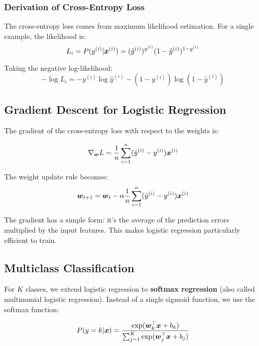 \subsubsection{Derivation of Cross-Entropy Loss}

The cross-entropy loss comes from maximum likelihood estimation. For a single example, the likelihood is:
$$L_i = P(y^{(i)}|\boldsymbol{x}^{(i)}) = (\hat{y}^{(i)})^{y^{(i)}} (1-\hat{y}^{(i)})^{1-y^{(i)}}$$

Taking the negative log-likelihood:
$$-\log L_i = -y^{(i)} \log \hat{y}^{(i)} - (1-y^{(i)}) \log(1-\hat{y}^{(i)})$$

\subsection{Gradient Descent for Logistic Regression}

The gradient of the cross-entropy loss with respect to the weights is:

\begin{equation}
\nabla_{\boldsymbol{w}} L = \frac{1}{n} \sum_{i=1}^{n} (\hat{y}^{(i)} - y^{(i)}) \boldsymbol{x}^{(i)}
\end{equation}

The weight update rule becomes:
\begin{equation}
\boldsymbol{w}_{t+1} = \boldsymbol{w}_t - \alpha \frac{1}{n} \sum_{i=1}^{n} (\hat{y}^{(i)} - y^{(i)}) \boldsymbol{x}^{(i)}
\end{equation}

\begin{remark}
The gradient has a simple form: it's the average of the prediction errors multiplied by the input features. This makes logistic regression particularly efficient to train.
\end{remark}

\subsection{Multiclass Classification}

For $K$ classes, we extend logistic regression to \textbf{softmax regression} (also called multinomial logistic regression). Instead of a single sigmoid function, we use the softmax function:

\begin{equation}
P(y=k|\boldsymbol{x}) = \frac{\exp(\boldsymbol{w}_k^\top \boldsymbol{x} + b_k)}{\sum_{j=1}^{K} \exp(\boldsymbol{w}_j^\top \boldsymbol{x} + b_j)}
\end{equation}

